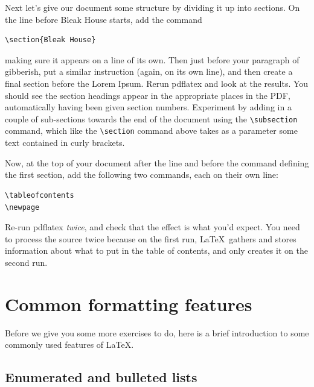 \begin{refsection}
Next let's give our document some structure by dividing it up into sections. On the line before Bleak House starts, add the command

\begin{verbatim}
\section{Bleak House}
\end{verbatim}
%
making sure it appears on a line of its own. Then just before your paragraph of gibberish, put  a similar instruction (again, on its own line), and then create a final section before the Lorem Ipsum. Rerun pdflatex and look at the results. You should see the section headings appear in the appropriate places in the PDF, automatically having been given section numbers. Experiment by adding in a couple of sub-sections towards the end of the document using the  \verb|\subsection| command, which like the \verb|\section| command above takes as a parameter some text  contained in curly brackets. 

Now, at the top of your document after the \verb|| line and before the command defining the first section, add the following two commands, each on their own line:

\begin{verbatim}
\tableofcontents
\newpage
\end{verbatim}
%
  Re-run pdflatex \emph{twice}, and check that the effect is what you'd expect. You need to process the source twice because on the first run, \LaTeX\ gathers and stores information about what to put in the table of contents, and only creates it on the second run.


\section{Common formatting features}

Before we give you some more exercises to do, here is a brief introduction to some commonly used features of \LaTeX.

\subsection{Enumerated and bulleted lists}


\end{refsection}

